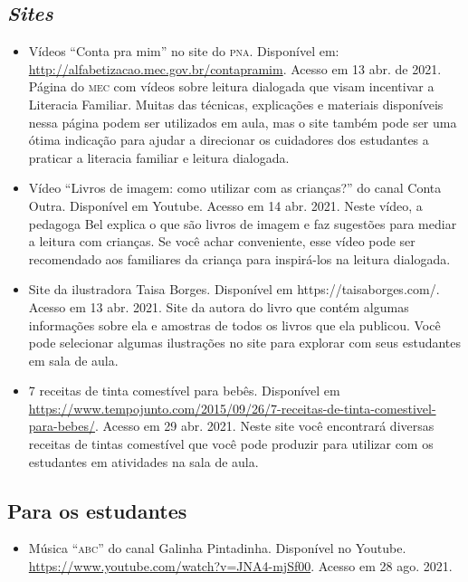 \documentclass[11pt]{extarticle}
\begin{document}
\subsection{\textit{Sites}}

\begin{itemize}
\item Vídeos “Conta pra mim” no site do \textsc{pna}. Disponível em: \url{http://alfabetizacao.mec.gov.br/contapramim}. 
Acesso em 13 abr. de 2021.
Página do \textsc{mec} com vídeos sobre leitura dialogada que visam incentivar a Literacia Familiar. Muitas das 
técnicas, explicações e materiais disponíveis nessa página podem ser utilizados em aula, mas o site também 
pode ser uma ótima indicação para ajudar a direcionar os cuidadores dos estudantes a praticar 
a literacia familiar e leitura dialogada.

\item Vídeo “Livros de imagem: como utilizar com as crianças?” do canal Conta Outra. Disponível em Youtube. 
Acesso em 14 abr. 2021. 
Neste vídeo, a pedagoga Bel explica o que são livros de imagem e faz sugestões para mediar a leitura com 
crianças. Se você achar conveniente, esse vídeo pode ser recomendado aos familiares da criança 
para inspirá-los na leitura dialogada. 

\item Site da ilustradora Taisa Borges. Disponível em https://taisaborges.com/. Acesso em 13 abr. 2021. 
Site da autora do livro que contém algumas informações sobre ela e amostras de todos os livros que ela publicou. 
Você pode selecionar algumas ilustrações no site para explorar com seus estudantes em sala de aula. 

\item 7 receitas de tinta comestível para bebês. 
Disponível em \url{https://www.tempojunto.com/2015/09/26/7-receitas-de-tinta-comestivel-para-bebes/}. 
Acesso em 29 abr. 2021. 
Neste site você encontrará diversas receitas de tintas comestível que você pode produzir 
para utilizar com os estudantes em atividades na sala de aula. 
\end{itemize}

\subsection{Para os estudantes}

\begin{itemize}
\item Música ``\textsc{abc}'' do canal Galinha Pintadinha. Disponível no Youtube. \url{https://www.youtube.com/watch?v=JNA4-mjSf00}. Acesso em 28 ago. 2021.


\end{itemize}
\end{document}
